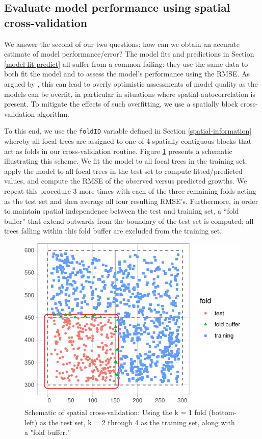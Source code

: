\documentclass[12pt]{article}
\begin{document}
\hypertarget{spatial-cross-validation}{%
\subsection{Evaluate model performance using spatial
cross-validation}\label{spatial-cross-validation}}

We answer the second of our two questions: how can we obtain an accurate
estimate of model performance/error? The model fits and predictions in
Section \ref{model-fit-predict} all suffer from a common failing: they
use the same data to both fit the model and to assess the model's
performance using the RMSE. As argued by
\citet{roberts_cross-validation_2017}, this can lead to overly
optimistic assessments of model quality as the models can be overfit, in
particular in situations where spatial-autocorrelation is present. To
mitigate the effects of such overfitting, we use a spatially block
cross-validation algorithm.

To this end, we use the \texttt{foldID} variable defined in Section
\ref{spatial-information} whereby all focal trees are assigned to one of
4 spatially contiguous blocks that act as folds in our cross-validation
routine. Figure \ref{fig:scbi-spatial-cross-validation-schematic}
presents a schematic illustrating this scheme. We fit the model to all
focal trees in the training set, apply the model to all focal trees in
the test set to compute fitted/predicted values, and compute the RMSE of
the observed versus predicted growths. We repeat this procedure 3 more
times with each of the three remaining folds acting as the test set and
then average all four resulting RMSE's. Furthermore, in order to
maintain spatial independence between the test and training set, a
``fold buffer'' that extend outwards from the boundary of the test set
is computed; all trees falling within this fold buffer are excluded from
the training set.

\begin{figure}

{\centering \includegraphics[width=0.66\linewidth]{Figures/scbi-spatial-cross-validation-schematic-1} 

}

\caption{Schematic of spatial cross-validation: Using the k = 1 fold (bottom-left) as the test set, k = 2 through 4 as the training set, along with a "fold buffer."}\label{fig:scbi-spatial-cross-validation-schematic}
\end{figure}
\end{document}
